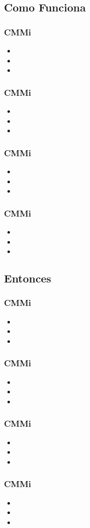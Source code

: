 \documentclass{beamer}
\begin{document}
\subsection{Como Funciona}

\frame
{
  \frametitle{CMMi}
  	\begin{itemize}
  	\item<1->
  	\item<2->
  	\item<3->
  	\end{itemize}
}

\frame
{
  \frametitle{CMMi}
  	\begin{itemize}
  	\item<1->
  	\item<2->
  	\item<3->
  	\end{itemize}
}

\frame
{
  \frametitle{CMMi}
  	\begin{itemize}
  	\item<1->
  	\item<2->
  	\item<3->
  	\end{itemize}
}

\frame
{
  \frametitle{CMMi}
  	\begin{itemize}
  	\item<1->
  	\item<2->
  	\item<3->
  	\end{itemize}
}

\subsection{Entonces}

\frame
{
  \frametitle{CMMi}
  	\begin{itemize}
  	\item<1->
  	\item<2->
  	\item<3->
  	\end{itemize}
}

\frame
{
  \frametitle{CMMi}
  	\begin{itemize}
  	\item<1->
  	\item<2->
  	\item<3->
  	\end{itemize}
}

\frame
{
  \frametitle{CMMi}
  	\begin{itemize}
  	\item<1->
  	\item<2->
  	\item<3->
  	\end{itemize}
}

\frame
{
  \frametitle{CMMi}
  	\begin{itemize}
  	\item<1->
  	\item<2->
  	\item<3->
  	\end{itemize}
}
\end{document}
